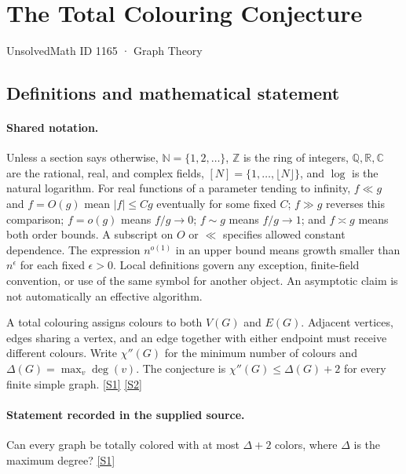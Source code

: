 \documentclass[11pt,a4paper]{article}
\newcommand{\N}{\mathbb{N}}
\newcommand{\Z}{\mathbb{Z}}
\newcommand{\Q}{\mathbb{Q}}
\newcommand{\R}{\mathbb{R}}
\newcommand{\C}{\mathbb{C}}
\newcommand{\sref}[2]{\hyperlink{source:#1:#2}{[S#2]}}
\begin{document}

\setcounter{section}{1164}

\section{The Total Colouring Conjecture}\label{1165}

{\small\sffamily UnsolvedMath ID 1165 · Graph Theory}

\subsection{Definitions and mathematical statement}

\paragraph{Shared notation.}Unless a section says otherwise, $\N=\{1,2,\ldots\}$,
$\Z$ is the ring of integers, $\Q,\R,\C$ are the rational, real, and complex
fields, $[N]=\{1,\ldots,\lfloor N\rfloor\}$, and $\log$ is the natural
logarithm. For real functions of a parameter tending to infinity,
$f\ll g$ and $f=O(g)$ mean $|f|\leq Cg$ eventually for some fixed $C$;
$f\gg g$ reverses this comparison; $f=o(g)$ means $f/g\to0$;
$f\sim g$ means $f/g\to1$; and $f\asymp g$ means both order bounds.
A subscript on $O$ or $\ll$ specifies allowed constant dependence.
The expression $n^{o(1)}$ in an upper bound means growth smaller than
$n^\epsilon$ for each fixed $\epsilon>0$. Local definitions govern any
exception, finite-field convention, or use of the same symbol for another
object. An asymptotic claim is not automatically an effective algorithm.



A total colouring assigns colours to both $V(G)$ and $E(G)$. Adjacent vertices, edges sharing a vertex, and an edge together with either endpoint must receive different colours. Write $\chi''(G)$ for the minimum number of colours and $\Delta(G)=\max_v\deg(v)$. The conjecture is $\chi''(G)\leq\Delta(G)+2$ for every finite simple graph. \sref{1165}{1} \sref{1165}{2}

\paragraph{Statement recorded in the supplied source.}
Can every graph be totally colored with at most $\Delta + 2$ colors, where $\Delta$ is the maximum degree? \sref{1165}{1}
\end{document}

